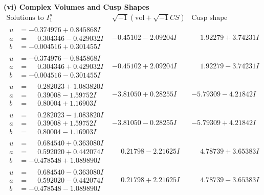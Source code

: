 \documentclass[1p]{elsarticle_modified}
\theoremstyle{definition}
\newcommand{\I}{\sqrt{-1}}
\begin{document}
\newpage\flushleft \textbf{(vi) Complex Volumes and Cusp Shapes}
$$\begin{array}{c|c|c}  
\text{Solutions to }I^u_{1}& \I (\text{vol} + \sqrt{-1}CS) & \text{Cusp shape}\\
 \hline 
\begin{aligned}
u &= -0.374976 + 0.845868 I \\
a &= \phantom{-}0.304346 - 0.429032 I \\
b &= -0.004516 + 0.301455 I\end{aligned}
 & -0.45102 - 2.09204 I & \phantom{-}1.92279 + 3.74231 I \\ \hline\begin{aligned}
u &= -0.374976 - 0.845868 I \\
a &= \phantom{-}0.304346 + 0.429032 I \\
b &= -0.004516 - 0.301455 I\end{aligned}
 & -0.45102 + 2.09204 I & \phantom{-}1.92279 - 3.74231 I \\ \hline\begin{aligned}
u &= \phantom{-}0.282023 + 1.083820 I \\
a &= \phantom{-}0.39008 - 1.59752 I \\
b &= \phantom{-}0.80004 + 1.16903 I\end{aligned}
 & -3.81050 + 0.28255 I & -5.79309 - 4.21842 I \\ \hline\begin{aligned}
u &= \phantom{-}0.282023 - 1.083820 I \\
a &= \phantom{-}0.39008 + 1.59752 I \\
b &= \phantom{-}0.80004 - 1.16903 I\end{aligned}
 & -3.81050 - 0.28255 I & -5.79309 + 4.21842 I \\ \hline\begin{aligned}
u &= \phantom{-}0.684540 + 0.363080 I \\
a &= \phantom{-}0.592020 + 0.442074 I \\
b &= -0.478548 + 1.089890 I\end{aligned}
 & \phantom{-}0.21798 - 2.21625 I & \phantom{-}4.78739 + 3.65383 I \\ \hline\begin{aligned}
u &= \phantom{-}0.684540 - 0.363080 I \\
a &= \phantom{-}0.592020 - 0.442074 I \\
b &= -0.478548 - 1.089890 I\end{aligned}
 & \phantom{-}0.21798 + 2.21625 I & \phantom{-}4.78739 - 3.65383 I \\ \hline\begin{aligned}

\end{aligned}
\end{array}$$
\end{document}
